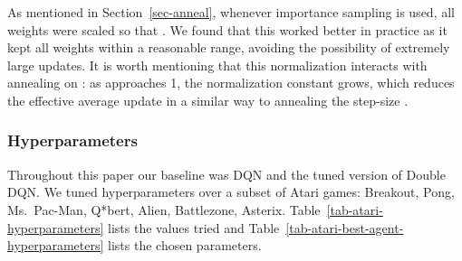 \documentclass[a4paper]{article}
\begin{document}
As mentioned in Section~\ref{sec-anneal}, whenever importance sampling is used, all weights  were scaled so that .  We found that this worked better in practice as it kept all weights within a reasonable range, avoiding the possibility of extremely large updates. It is worth mentioning that this normalization interacts with annealing on : as  approaches 1, the normalization constant grows, which reduces the effective average update in a similar way to annealing the step-size .

\subsubsection{Hyperparameters}

Throughout this paper our baseline was DQN and the tuned version of Double DQN.  We tuned hyperparameters over a subset of Atari games: Breakout, Pong, Ms.\ Pac-Man, Q*bert, Alien, Battlezone, Asterix.  Table~\ref{tab-atari-hyperparameters} lists the values tried and Table~\ref{tab-atari-best-agent-hyperparameters} lists the chosen parameters.

\begin{table*}[!hp]
\centering


\caption{
\label{tab-atari-hyperparameters}
Hyperparameters considered in experiments.  Here .
}
\end{table*}
\end{document}
